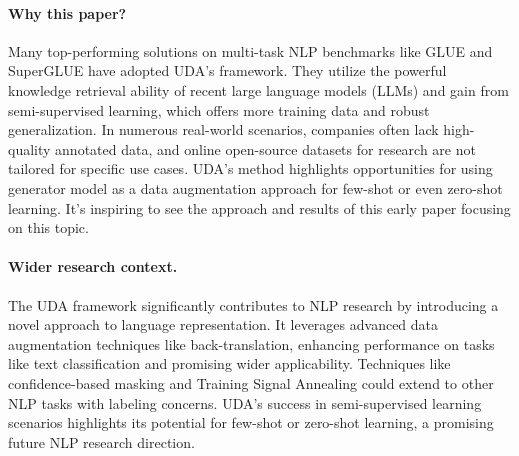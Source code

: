 \documentclass{article}
\begin{document}
\paragraph{Why this paper?}
Many top-performing solutions on multi-task NLP benchmarks like GLUE and SuperGLUE 
have adopted UDA's framework. They utilize the powerful knowledge retrieval ability of 
recent large language models (LLMs) and gain from semi-supervised learning, which 
offers more training data and robust generalization. In numerous real-world scenarios, 
companies often lack high-quality annotated data, and online open-source datasets for 
research are not tailored for specific use cases. UDA's method highlights 
opportunities for using generator model as a data augmentation approach for few-shot or even 
zero-shot learning. It's inspiring to see the approach and results of this early paper 
focusing on this topic.

\paragraph{Wider research context.}
The UDA framework significantly contributes to NLP research by introducing a novel 
approach to language representation. It leverages advanced data augmentation techniques 
like back-translation, enhancing performance on tasks like text classification and 
promising wider applicability. Techniques like confidence-based masking and Training 
Signal Annealing could extend to other NLP tasks with labeling concerns. UDA's success 
in semi-supervised learning scenarios highlights its potential for few-shot or 
zero-shot learning, a promising future NLP research direction.
\end{document}
